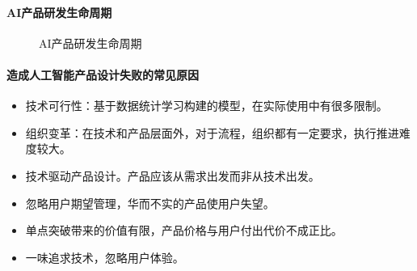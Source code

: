 \documentclass[letterpaper,11pt,english]{sphinxmanual}
\begin{document}
\paragraph{AI产品研发生命周期}
\label{\detokenize{chapter_introduction/AI_Product:id14}}
\begin{figure}[H]
\centering
\capstart

\noindent{}
\caption{AI产品研发生命周期\sphinxfootnotemark[212]}\label{\detokenize{chapter_introduction/AI_Product:id24}}\end{figure}
%
\begin{footnotetext}[212]\sphinxAtStartFootnote
{}
%
\end{footnotetext}\ignorespaces 

\paragraph{造成人工智能产品设计失败的常见原因}
\label{\detokenize{chapter_introduction/AI_Product:id15}}\begin{itemize}
\item {} 
技术可行性：基于数据统计学习构建的模型，在实际使用中有很多限制。

\item {} 
组织变革：在技术和产品层面外，对于流程，组织都有一定要求，执行推进难度较大。%
\begin{footnote}[213]\sphinxAtStartFootnote
{}
%
\end{footnote}

\item {} 
技术驱动产品设计。产品应该从需求出发而非从技术出发。

\item {} 
忽略用户期望管理，华而不实的产品使用户失望。

\item {} 
单点突破带来的价值有限，产品价格与用户付出代价不成正比。

\item {} 
一味追求技术，忽略用户体验。 %
\begin{footnote}[214]\sphinxAtStartFootnote
{}
%
\end{footnote}

\end{itemize}
\end{document}
